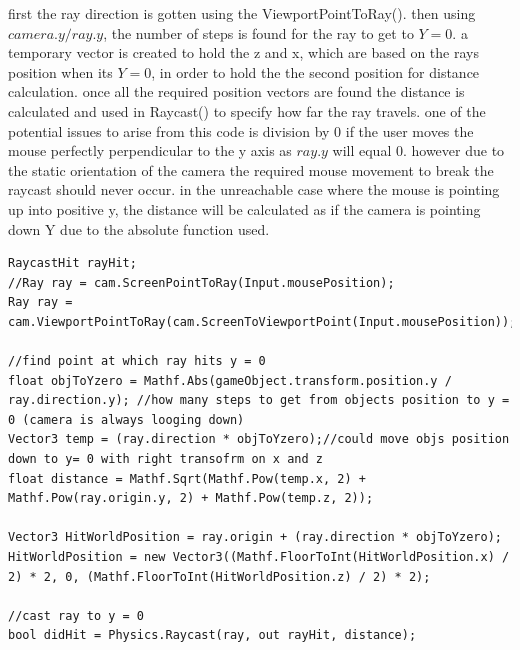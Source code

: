 first the ray direction is gotten using the ViewportPointToRay(). then using $camera.y / ray.y$, the number of steps is found for the ray to get to $Y=0$. a temporary vector is created to hold the z and x, which are based on the rays position when its $Y=0$, in order to hold the the second position for distance calculation. once all the required position vectors are found the distance is calculated and used in Raycast() to specify how far the ray travels. one of the potential issues to arise from this code is division by 0 if the user moves the mouse perfectly perpendicular to the y axis as $ray.y$ will equal 0. however due to the static orientation of the camera the required mouse movement to break the raycast should never occur. in the unreachable case where the mouse is pointing up into positive y, the distance will be calculated as if the camera is pointing down Y due to the absolute function used.
\begin{minipage}{\textwidth}
\begin{lstlisting}[language={[Sharp]C}, caption=calculate distance for ray to travel, label=clst:rayDist]
RaycastHit rayHit;
//Ray ray = cam.ScreenPointToRay(Input.mousePosition);
Ray ray = cam.ViewportPointToRay(cam.ScreenToViewportPoint(Input.mousePosition));

//find point at which ray hits y = 0
float objToYzero = Mathf.Abs(gameObject.transform.position.y / ray.direction.y); //how many steps to get from objects position to y = 0 (camera is always looging down)
Vector3 temp = (ray.direction * objToYzero);//could move objs position down to y= 0 with right transofrm on x and z
float distance = Mathf.Sqrt(Mathf.Pow(temp.x, 2) + Mathf.Pow(ray.origin.y, 2) + Mathf.Pow(temp.z, 2));

Vector3 HitWorldPosition = ray.origin + (ray.direction * objToYzero);
HitWorldPosition = new Vector3((Mathf.FloorToInt(HitWorldPosition.x) / 2) * 2, 0, (Mathf.FloorToInt(HitWorldPosition.z) / 2) * 2);

//cast ray to y = 0
bool didHit = Physics.Raycast(ray, out rayHit, distance);
\end{lstlisting}
\end{minipage}
